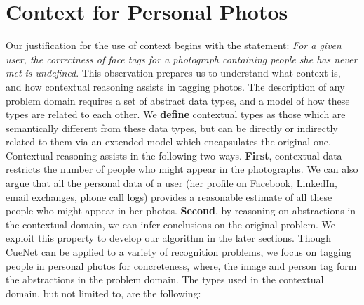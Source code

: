 

\section{Context for Personal Photos}
Our justification for the use of context begins with the statement: \textit{For a given user, the correctness of face tags for a photograph containing people she has never met is undefined}. This observation prepares us to understand what context is, and how contextual reasoning assists in tagging photos. The description of any problem domain requires a set of abstract data types, and a model of how these types are related to each other. We \textbf{define} contextual types as those which are semantically different from these data types, but can be directly or indirectly related to them via an extended model which encapsulates the original one. Contextual reasoning assists in the following two ways. \textbf{First}, contextual data restricts the number of people who might appear in the photographs. We can also argue that all the personal data of a user (her profile on Facebook, LinkedIn, email exchanges, phone call logs) provides a reasonable estimate of all these people who might appear in her photos. \textbf{Second}, by reasoning on abstractions in the contextual domain, we can infer conclusions on the original problem. We exploit this property to develop our algorithm in the later sections. Though CueNet can be applied to a variety of recognition problems, we focus on tagging people in personal photos for concreteness, where, the image and person tag form the abstractions in the problem domain. The types used in the contextual domain, but not limited to, are the following:

